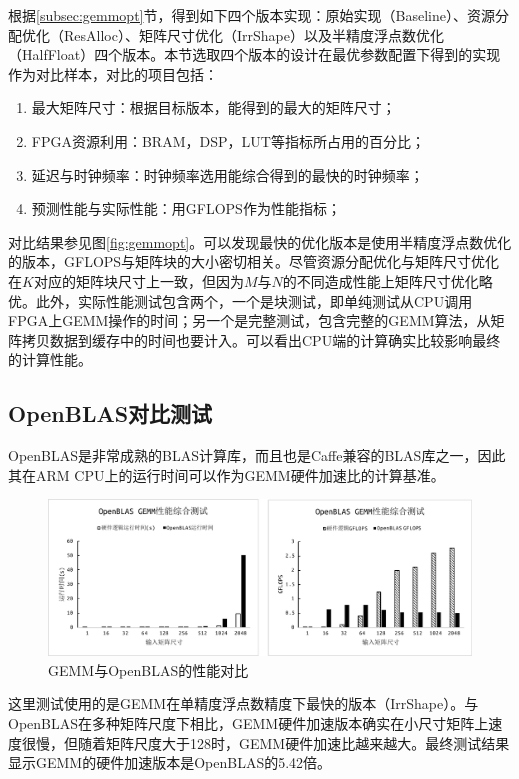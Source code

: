 根据\ref{subsec:gemmopt}节，得到如下四个版本实现：原始实现（Baseline）、资源分配优化（ResAlloc）、矩阵尺寸优化（IrrShape）以及半精度浮点数优化（HalfFloat）四个版本。本节选取四个版本的设计在最优参数配置下得到的实现作为对比样本，对比的项目包括：
\begin{enumerate}
\item 最大矩阵尺寸：根据目标版本，能得到的最大的矩阵尺寸；
\item FPGA资源利用：BRAM，DSP，LUT等指标所占用的百分比；
\item 延迟与时钟频率：时钟频率选用能综合得到的最快的时钟频率；
\item 预测性能与实际性能：用GFLOPS作为性能指标；
\end{enumerate}

对比结果参见图\ref{fig:gemmopt}。可以发现最快的优化版本是使用半精度浮点数优化的版本，GFLOPS与矩阵块的大小密切相关。尽管资源分配优化与矩阵尺寸优化在$K$对应的矩阵块尺寸上一致，但因为$M$与$N$的不同造成性能上矩阵尺寸优化略优。此外，实际性能测试包含两个，一个是块测试，即单纯测试从CPU调用FPGA上GEMM操作的时间；另一个是完整测试，包含完整的GEMM算法，从矩阵拷贝数据到缓存中的时间也要计入。可以看出CPU端的计算确实比较影响最终的计算性能。

\subsection{OpenBLAS对比测试}

OpenBLAS是非常成熟的BLAS计算库，而且也是Caffe兼容的BLAS库之一，因此其在ARM CPU上的运行时间可以作为GEMM硬件加速比的计算基准。

\begin{figure}[!ht]
\centering	
\includegraphics[width=\textwidth]{assets/imgs/gemmblas.pdf}
\caption{GEMM与OpenBLAS的性能对比}
\label{fig:gemmblas}
\end{figure}

这里测试使用的是GEMM在单精度浮点数精度下最快的版本（IrrShape）。与OpenBLAS在多种矩阵尺度下相比，GEMM硬件加速版本确实在小尺寸矩阵上速度很慢，但随着矩阵尺度大于128时，GEMM硬件加速比越来越大。最终测试结果显示GEMM的硬件加速版本是OpenBLAS的5.42倍。

